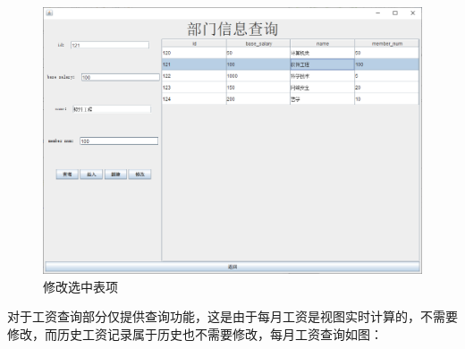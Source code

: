 \documentclass[withoutpreface,bwprint]{cumcmthesis} %
\begin{document}
\begin{figure}[H]
    \centering
    \includegraphics[width=0.8\linewidth]{change}
    \caption{修改选中表项}
\end{figure}
对于工资查询部分仅提供查询功能，这是由于每月工资是视图实时计算的，不需要修改，而历史工资记录属于历史也不需要修改，每月工资查询如图：
\end{document}
